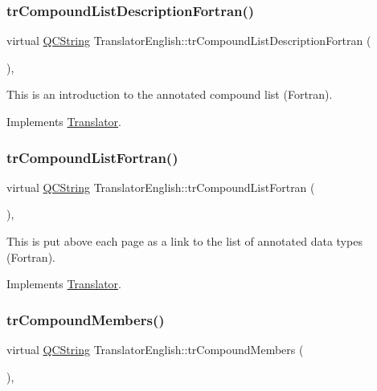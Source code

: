 \subsubsection{\texorpdfstring{trCompoundListDescriptionFortran()}{trCompoundListDescriptionFortran()}}
{\footnotesize\ttfamily virtual \mbox{\hyperlink{class_q_c_string}{Q\+C\+String}} Translator\+English\+::tr\+Compound\+List\+Description\+Fortran (\begin{DoxyParamCaption}{ }\end{DoxyParamCaption})\hspace{0.3cm}{\ttfamily [inline]}, {\ttfamily [virtual]}}

This is an introduction to the annotated compound list (Fortran). 

Implements \mbox{\hyperlink{class_translator}{Translator}}.

\mbox{\label{class_translator_english_aed37ea1d7badf7d9c68f3de6da872c04}} 
\subsubsection{\texorpdfstring{trCompoundListFortran()}{trCompoundListFortran()}}
{\footnotesize\ttfamily virtual \mbox{\hyperlink{class_q_c_string}{Q\+C\+String}} Translator\+English\+::tr\+Compound\+List\+Fortran (\begin{DoxyParamCaption}{ }\end{DoxyParamCaption})\hspace{0.3cm}{\ttfamily [inline]}, {\ttfamily [virtual]}}

This is put above each page as a link to the list of annotated data types (Fortran). 

Implements \mbox{\hyperlink{class_translator}{Translator}}.

\mbox{\label{class_translator_english_abda93dfab33f17cd22b52e73ab0731ed}} 
\subsubsection{\texorpdfstring{trCompoundMembers()}{trCompoundMembers()}}
{\footnotesize\ttfamily virtual \mbox{\hyperlink{class_q_c_string}{Q\+C\+String}} Translator\+English\+::tr\+Compound\+Members (\begin{DoxyParamCaption}{ }\end{DoxyParamCaption})\hspace{0.3cm}{\ttfamily [inline]}, {\ttfamily [virtual]}}

